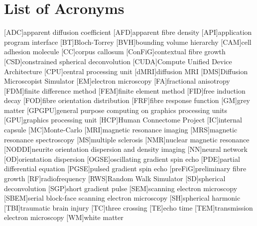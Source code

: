 
\chapter*{List of Acronyms}

\makeatletter
\patchcmd{\AC@@acro}{] #3}{] \MakeUppercase #3}{}{}
\patchcmd{\AC@@acro}{] #3}{] \MakeUppercase #3}{}{}
\makeatother
\begin{acronym}
  [ADC]{apparent diffusion coefficient}
  [AFD]{apparent fibre density}
  [API]{application program interface}
  [BT]{Bloch-Torrey}
  [BVH]{bounding volume hierarchy}
  [CAM]{cell adhesion molecule}
  [CC]{corpus callosum}
  [ConFiG]{contextual fibre growth}
  [CSD]{constrained spherical deconvolution}
  [CUDA]{Compute Unified Device Architecture}
  [CPU]{central processing unit}
  [dMRI]{diffusion MRI}
  [DMS]{Diffusion Microscopist Simulator}
  [EM]{electron microscopy}
  [FA]{fractional anisotropy}
  [FDM]{finite difference method}
  [FEM]{finite element method}
  [FID]{free induction decay}
  [FOD]{fibre orientation distribution}
  [FRF]{fibre response function}
  [GM]{grey matter}
  [GPGPU]{general purpose computing on graphics processing units}
  [GPU]{graphics processing unit}
  [HCP]{Human Connectome Project}
  [IC]{internal capsule}
  [MC]{Monte-Carlo}
  [MRI]{magnetic resonance imaging}
  [MRS]{magnetic resonance spectroscopy}
  [MS]{multiple sclerosis}
  [NMR]{nuclear magnetic resonance}
  [NODDI]{neurite orientation dispersion and density imaging}
  [NN]{neural network}
  [OD]{orientation dispersion}
  [OGSE]{oscillating gradient spin echo}
  [PDE]{partial differential equation}
  [PGSE]{pulsed gradient spin echo}
  [preFiG]{preliminary fibre growth}
  [RF]{radiofrequency}
  [RWS]{Random Walk Simulator}
  [SD]{spherical deconvolution}
  [SGP]{short gradient pulse}
  [SEM]{scanning electron microscopy}
  [SBEM]{serial block-face scanning electron microscopy}
  [SH]{spherical harmonic}
  [TBI]{traumatic brain injury}
  [TC]{three crossing}
  [TE]{echo time}
  [TEM]{transmission electron microscopy}
  [WM]{white matter}
\end{acronym}


